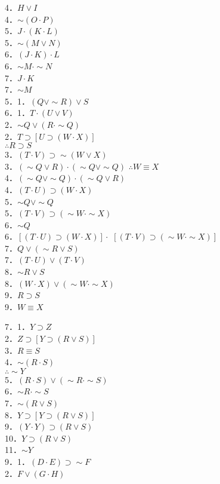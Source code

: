 \begin{enumerate}
4．$H \vee I$\\
4．$\sim(O \cdot P)$\\
5．$J \cdot(K \cdot L)$\\
5．$\sim(M \vee N)$\\
6．$(J \cdot K) \cdot L$\\
6．$\sim M \cdot \sim N$\\
7．$J \cdot K$\\
7．$\sim M$\\
5．1．$(Q \vee \sim R) \vee S$\\
6．1．$T \cdot(U \vee V)$\\
2．$\sim Q \vee(R \cdot \sim Q)$\\
2．$T \supset[U \supset(W \cdot X)]$\\
$\therefore R \supset S$\\
3．$(T \cdot V) \supset \sim(W \vee X)$\\
3．$(\sim Q \vee R) \cdot(\sim Q \vee \sim Q)$ $\therefore W \equiv X$\\
4．$(\sim Q \vee \sim Q) \cdot(\sim Q \vee R)$\\
4．$(T \cdot U) \supset(W \cdot X)$\\
5．$\sim Q \vee \sim Q$\\
5．$(T \cdot V) \supset(\sim W \cdot \sim X)$\\
6．$\sim Q$\\
6．$[(T \cdot U) \supset(W \cdot X)] \cdot$ $[(T \cdot V) \supset(\sim W \cdot \sim X)]$\\
7．$Q \vee(\sim R \vee S)$\\
7．$(T \cdot U) \vee(T \cdot V)$\\
8．$\sim R \vee S$\\
8．$(W \cdot X) \vee(\sim W \cdot \sim X)$\\
9．$R \supset S$\\
9．$W \equiv X$
\end{enumerate}

7．1．$Y \supset Z$\\
2．$Z \supset[Y \supset(R \vee S)]$\\
3．$R \equiv S$\\
4．$\sim(R \cdot S)$\\
$\therefore \sim Y$\\
5．$(R \cdot S) \vee(\sim R \cdot \sim S)$\\
6．$\sim R \cdot \sim S$\\
7．$\sim(R \vee S)$\\
8．$Y \supset[Y \supset(R \vee S)]$\\
9．$(Y \cdot Y) \supset(R \vee S)$\\
10．$Y \supset(R \vee S)$\\
11．$\sim Y$\\
9．1．$(D \cdot E) \supset \sim F$\\
2．$F \vee(G \cdot H)$

